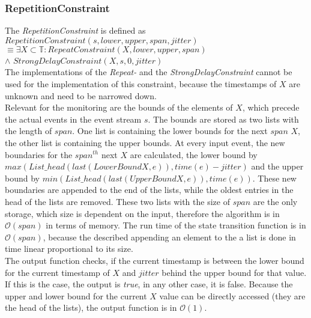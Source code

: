 \subsubsection{RepetitionConstraint}
	The  \emph{RepetitionConstraint} is defined as\\[10pt]
		$RepetitionConstraint(s, lower, upper, span, jitter)$\\
		$\equiv \exists X\subset \mathbb{T}: RepeatConstraint (X, lower, upper, span)$\\
		\hspace{7cm}$\land$ $StrongDelayConstraint(X, s, 0, jitter)$\\[10pt]
	The implementations of the \emph{Repeat-} and the \emph{StrongDelayConstraint} cannot be used for the implementation of this constraint, because the timestamps of $X$ are unknown and need to be narrowed down.\\
	Relevant for the monitoring are the bounds of the elements of $X$, which precede the actual events in the event stream $s$. The bounds are stored as two lists with the length of $span$. One list is containing the lower bounds for the next $span$ $X$, the other list is containing the upper bounds. At every input event, the new boundaries for the $span^{th}$ next $X$ are calculated, the lower bound by $max(List\_head(last(LowerBoundX, e)), time(e)-jitter)$ and the upper bound by $min(List\_head(last(UpperBoundX, e)), time(e))$. These new boundaries are appended to the end of the lists, while the oldest entries in the head of the lists are removed. These two lists with the size of $span$ are the only storage, which size is dependent on the input, therefore the algorithm is in $\mathcal{O}(span)$ in terms of memory. The run time of the state transition function is in $\mathcal{O}(span)$, because the described appending an element to the a list is done in time linear proportional to its size.\\
	The output function checks, if the current timestamp is between the lower bound for the current timestamp of $X$ and $jitter$ behind the upper bound for that value. If this is the case, the output is \emph{true}, in any other case, it is false. Because the upper and lower bound for the current $X$ value can be directly accessed (they are the head of the lists), the output function is in $\mathcal{O}(1)$.
	
